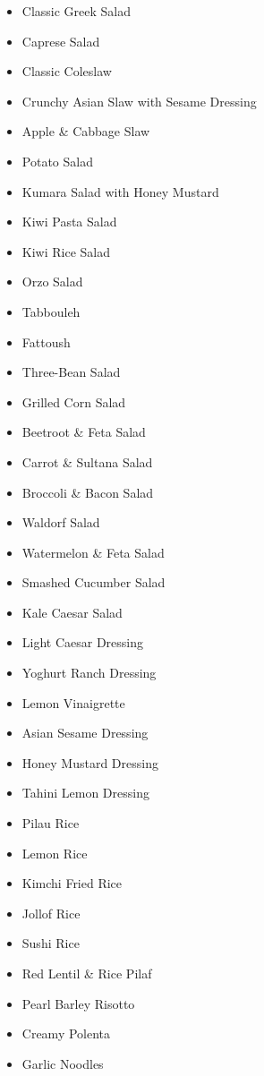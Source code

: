 \begin{itemize}
  \item \todo Classic Greek Salad
  \item \todo Caprese Salad
  \item \todo Classic Coleslaw
  \item \todo Crunchy Asian Slaw with Sesame Dressing
  \item \todo Apple \& Cabbage Slaw
  \item \todo Potato Salad
  \item \todo Kumara Salad with Honey Mustard
  \item \todo Kiwi Pasta Salad 
  \item \todo Kiwi Rice Salad
  \item \todo Orzo Salad
  \item \todo Tabbouleh
  \item \todo Fattoush
  \item \todo Three-Bean Salad
  \item \todo Grilled Corn Salad
  \item \todo Beetroot \& Feta Salad
  \item \todo Carrot \& Sultana Salad
  \item \todo Broccoli \& Bacon Salad
  \item \todo Waldorf Salad
  \item \todo Watermelon \& Feta Salad
  \item \todo Smashed Cucumber Salad
  \item \todo Kale Caesar Salad
\end{itemize}

\begin{itemize}
  \item \todo Light Caesar Dressing
  \item \todo Yoghurt Ranch Dressing
  \item \todo Lemon Vinaigrette
  \item \todo Asian Sesame Dressing
  \item \todo Honey Mustard Dressing
  \item \todo Tahini Lemon Dressing
\end{itemize}

\begin{itemize}
  \item \todo Pilau Rice
  \item \todo Lemon Rice
  \item \todo Kimchi Fried Rice
  \item \todo Jollof Rice
  \item \todo Sushi Rice
  \item \todo Red Lentil \& Rice Pilaf
  \item \todo Pearl Barley Risotto 
  \item \todo Creamy Polenta
  \item \todo Garlic Noodles
\end{itemize}

